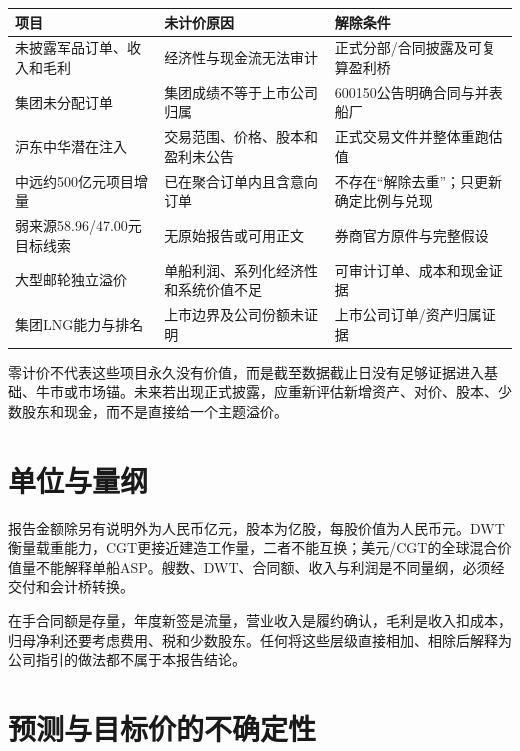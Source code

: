 \begin{exhibitbox}[零基础估值信用清单]
\small
\begin{tabularx}{\exhibitboxwidth}{L{4.2cm}L{5.0cm}X}
\toprule
\textbf{项目} & \textbf{未计价原因} & \textbf{解除条件} \\
\midrule
未披露军品订单、收入和毛利 & 经济性与现金流无法审计 & 正式分部/合同披露及可复算盈利桥 \\
集团未分配订单 & 集团成绩不等于上市公司归属 & 600150公告明确合同与并表船厂 \\
沪东中华潜在注入 & 交易范围、价格、股本和盈利未公告 & 正式交易文件并整体重跑估值 \\
中远约500亿元项目增量 & 已在聚合订单内且含意向订单 & 不存在“解除去重”；只更新确定比例与兑现 \\
弱来源58.96/47.00元目标线索 & 无原始报告或可用正文 & 券商官方原件与完整假设 \\
大型邮轮独立溢价 & 单船利润、系列化经济性和系统价值不足 & 可审计订单、成本和现金证据 \\
集团LNG能力与排名 & 上市边界及公司份额未证明 & 上市公司订单/资产归属证据 \\
\bottomrule
\end{tabularx}
\end{exhibitbox}

零计价不代表这些项目永久没有价值，而是截至数据截止日没有足够证据进入基础、牛市或市场锚。未来若出现正式披露，应重新评估新增资产、对价、股本、少数股东和现金，而不是直接给一个主题溢价。

\section{单位与量纲}

报告金额除另有说明外为人民币亿元，股本为亿股，每股价值为人民币元。DWT衡量载重能力，CGT更接近建造工作量，二者不能互换；美元/CGT的全球混合价值量不能解释单船ASP。艘数、DWT、合同额、收入与利润是不同量纲，必须经交付和会计桥转换。

\begin{sourcequalitybox}[量纲控制]
在手合同额是存量，年度新签是流量，营业收入是履约确认，毛利是收入扣成本，归母净利还要考虑费用、税和少数股东。任何将这些层级直接相加、相除后解释为公司指引的做法都不属于本报告结论。
\end{sourcequalitybox}

\section{预测与目标价的不确定性}

